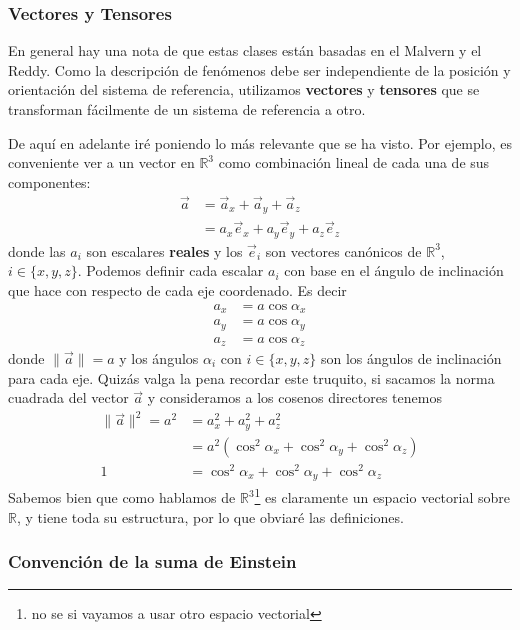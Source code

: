 \documentclass[11pt,a4paper]{article}
\begin{document}
\subsubsection{Vectores y Tensores}

En general hay una nota de que estas clases están basadas en el Malvern y el Reddy. Como la descripción de fenómenos debe ser independiente de la posición y orientación del sistema de referencia, utilizamos \textbf{vectores} y \textbf{tensores} que se transforman fácilmente de un sistema de referencia a otro.

De aquí en adelante iré poniendo lo más relevante que se ha visto. Por ejemplo, es conveniente ver a un vector en $\mathbb{R}^3$ como combinación lineal de cada una de sus componentes:
\begin{align*}
\vec{a}&=\vec{a}_x+\vec{a}_y+\vec{a}_z\\
&=a_x\vec{e}_x+a_y\vec{e}_y+a_z\vec{e}_z
\end{align*}
donde las $a_i$ son escalares \textbf{reales} y los $\vec{e}_i$ son vectores canónicos de $\mathbb{R}^3$, $i\in\{x,y,z\}$. Podemos definir cada escalar $a_i$ con base en el ángulo de inclinación que hace con respecto de cada eje coordenado. Es decir
\begin{align*}
a_x&=a\cos\alpha_x\\
a_y&=a\cos\alpha_y\\
a_z&=a\cos\alpha_z
\end{align*}
donde $\|\vec{a}\|=a$ y los ángulos $\alpha_i$ con $i\in\{x,y,z\}$ son los ángulos de inclinación para cada eje. Quizás valga la pena recordar este truquito, si sacamos la norma cuadrada del vector $\vec{a}$ y consideramos a los cosenos directores tenemos
\begin{align*}
\|\vec{a}\|^2=a^2&=a_x^2+a_y^2+a_z^2\\
&=a^2\left(\cos^2\alpha_x+\cos^2\alpha_y+\cos^2\alpha_z\right)\\
1&=\cos^2\alpha_x+\cos^2\alpha_y+\cos^2\alpha_z
\end{align*}
Sabemos bien que como hablamos de $\mathbb{R}^3$\footnote{no se si vayamos a usar otro espacio vectorial} es claramente un espacio vectorial sobre $\mathbb{R}$, y tiene toda su estructura, por lo que obviaré las definiciones.

\subsubsection{Convención de la suma de Einstein}
\end{document}
